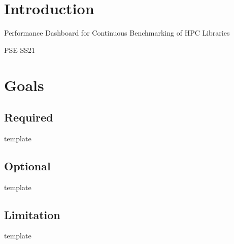 \section{Introduction}

Performance Dashboard for Continuous Benchmarking of HPC Libraries

PSE SS21

\section{Goals}

\subsection{Required}


template

\subsection{Optional}


template

\subsection{Limitation}


template